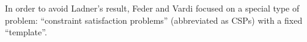 \begin{comment}
In order to find a subclass of NP which avoids Ladner's Theorem, Feder and Vardi used a result of Fagin \cite{fagin-snp} which showed an equivalence between problems in NP and problems in finitary existential second order logic. I hope I can state these results correctly, as I'm not very familiar with the ``strict NP'' point of view.

\begin{thm}[Fagin \cite{fagin-snp}] A set $S$ of finite models of a language $\mathcal{L}$ is in NP if and only if there exists a first order sentence $\phi$ in a language $\mathcal{L}'$ containing $\mathcal{L}$ such that $S = \{M \mid \exists R_1, ..., R_k\ (M, R_1, ..., R_k) \models \phi,\ |M| < \infty\}$, where $R_1, ..., R_k$ are the new function and relation symbols of $\mathcal{L}'$.
\end{thm}

\begin{defn} A set of finite models of a relational language $\mathcal{L}$ is in \emph{SNP} if it can be characterized by a second order logic formula $\varphi$ of the form $\exists R_1, ..., R_k \forall x_1, ..., x_n \phi$, where $R_1, ..., R_k$ are relations and $\phi$ is quantifier-free. The formula $\varphi$ is called \emph{monadic} if each relation $R_i$ is unary, $\varphi$ is called \emph{monotone} if each relation of $\mathcal{L}$ appears in the formula $\phi$ only negatively, and we say that $\varphi$ is \emph{without inequality} if the formula $\phi$ has no negative occurences of $\ne$ (or positive occurences of $=$). We say that a set of finite models of a relational language is in MMSNP if it can be characterized by a second order existential formula $\varphi$ as above which is monotone, monadic, and without inequality.
\end{defn}

Feder and Vardi \cite{feder-vardi} showed that for any two of ``monotone'', ``monadic'', and ``without inequality'', if one restricts to the subclass of SNP defined by formulas satisfying these two properties, one can find a polynomially equivalent problem in this subclass to any problem in NP, so Ladner's Theorem still applies. This motivated the restriction to MMSNP. Using randomized constructions of hypergraphs of large girth, Feder and Vardi then showed that problems in MMSNP are equivalent to constraint satisfaction problems.
\end{comment}

In order to avoid Ladner's result, Feder and Vardi focused on a special type of problem: ``constraint satisfaction problems'' (abbreviated as CSPs) with a fixed ``template''.%

